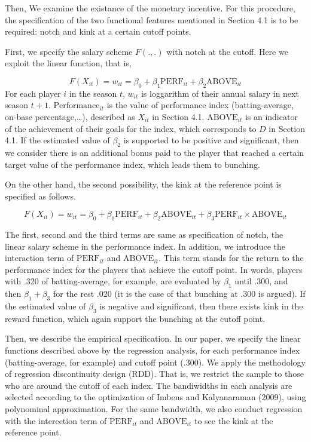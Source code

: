 \documentclass[dvipdfmx, 12pt]{article}
\begin{document}
  Then, We examine the existance of the monetary incentive. For this procedure, the specification of the two functional features mentioned in Section 4.1 is to be required: notch and kink at a certain cutoff points.

  First, we specify the salary scheme $F(.,.)$ with notch at the cutoff. Here we exploit the linear function, that is,

  \[
  F(X_{it}) = w_{it} = \beta_0 + \beta_1 \text{PERF}_{it} + \beta_2 \text{ABOVE}_{it}
  \]
  For each player $i$ in the season $t$, $w_{it}$ is loggarithm of their annual salary in next season $t+1$. $\text{Performance}_{it}$ is the value of performance index (batting-average, on-base percentage,\ldots), described as $X_{it}$ in Section 4.1. $\text{ABOVE}_{it}$ is an indicator of the achievement of their goals for the index, which corresponds to $D$ in Section 4.1. If the estimated value of $\beta_2$ is supported to be positive and significant, then we consider there is an additional bonus paid to the player that reached a certain target value of the performance index, which leads them to bunching.

  On the other hand, the second possibility, the kink at the reference point is specified as follows.

  \[
  F(X_{it}) = w_{it} = \beta_0 + \beta_1 \text{PERF}_{it} + \beta_2 \text{ABOVE}_{it} + \beta_3 \text{PERF}_{it} \times \text{ABOVE}_{it}
  \]

  The first, second and the third terms are same as specification of notch, the linear salary scheme in the performance index. In addition, we introduce the interaction term of $\text{PERF}_{it}$ and $\text{ABOVE}_{it}$. This term stands for the return to the performance index for the players that achieve the cutoff point. In words, players with .320 of batting-average, for example, are evaluated by $\beta_1$ until .300, and then $\beta_1 + \beta_3$ for the rest .020 (it is the case of that bunching at .300 is argued). If the estimated value of $\beta_3$ is negative and significant, then there exists kink in the reward function, which again support the bunching at the cutoff point.

  Then, we describe the empirical specification. In our paper, we specify the linear functions described above by the regression analysis, for each performance index (batting-average, for example) and cutoff point (.300). We apply the methodology of regression discontinuity design (RDD). That is, we restrict the sample to those who are around the cutoff of each index. The bandiwidths in each analysis are selected according to the optimization of Imbens and Kalyanaraman (2009), using polynominal approximation. For the same bandwidth, we also conduct regression with the interection term of $\text{PERF}_{it}$ and $\text{ABOVE}_{it}$ to see the kink at the reference point.
\end{document}
